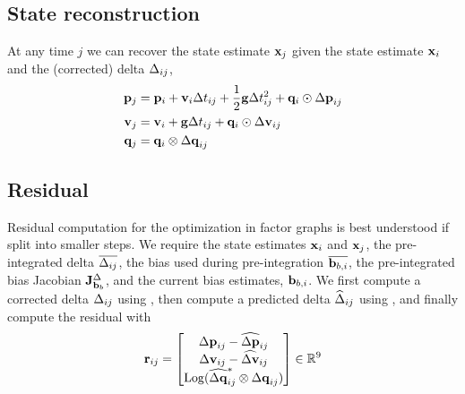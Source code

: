 \subsection{State reconstruction}

At any time $j$ we can recover the state estimate ${\bf x}_j$ given the state estimate ${\bf x}_i$ and the (corrected) delta $\Delta_{ij}$,
%
\begin{align} \label{equ:reconstruction}
\begin{split}
{\bf p}_j &= {\bf p}_i + {\bf v}_i\Delta t_{ij} + \frac12{\bf g}\Delta t_{ij}^2 + {\bf q}_i\odot{\Delta{\bf p}}_{ij} \\
{\bf v}_j &= {\bf v}_i + {\bf g}\Delta t_{ij} + {\bf q}_i\odot{\Delta{\bf v}}_{ij} \\
{\bf q}_j &= {\bf q}_i\otimes{\Delta{\bf q}}_{ij}   
\end{split}
\end{align}



\subsection{Residual}

Residual computation for the optimization in factor graphs is best understood if split into smaller steps. We require the state estimates ${\bf x}_i$ and ${\bf x}_j$, the pre-integrated delta $\overline{\Delta_{ij}}$, the bias used during pre-integration $\overline{{\bf b}_{b,i}}$, the pre-integrated bias Jacobian ${{\bf J}^{\Delta}_{{\bf b}_b}}$, and the current bias estimates, ${\bf b}_{b,i}$. We first compute a corrected delta $\Delta_{ij}$ using , then compute a predicted delta $\widehat{\Delta}_{ij}$ using , and finally compute the residual with
%
\begin{align}
{\bf r}_{ij} = \begin{bmatrix}
{\Delta{\bf p}}_{ij}-\widehat{{\Delta{\bf p}}}_{ij} \\
{\Delta{\bf v}}_{ij}-\widehat{{\Delta{\bf v}}}_{ij} \\
\operatorname*{Log}(\widehat{{\Delta{\bf q}}}_{ij}^*\otimes{\Delta{\bf q}}_{ij})
\end{bmatrix} \in {\mathbb R}^9
\end{align}




